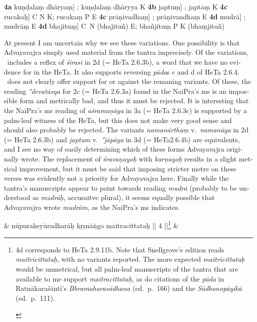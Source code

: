\documentclass[naipra.tex]{subfiles}
\begin{document}
\begin{sanskrit}
{\begin{english}
\begin{prosequote}
		\noindent \textbf{4a} kuṇḍalaṃ dhāryaṃ] ; kuṇḍalaṃ dhāryya K
		\textbf{4b} japtuṃ] ; japtaṃ K
		\textbf{4c} rucakaḥ] C N K; rucakaṃ P E
		\textbf{4c} prāṇivadhaṃ] ; prāṇivandhaṃ E
		\textbf{4d} mudrā] ; mudrāṃ E
		\textbf{4d} bhajituṃ] C\PCreading\ N (bhajituñ) E; bhañjituṃ P K (bhaṃjituñ)
	\end{prosequote}

	At present I am uncertain why we see these variations.
	One possibility is that Advayavajra simply used material from the tantra imprecisely.
	Of the variations, \TIB\ includes a reflex of \emph{śirasi} in 2d (= HeTa 2.6.3b), a word that we have no evidence for in the HeTa.
	It also supports reversing \emph{pāda}s c and d of HeTa 2.6.4.
	\TIB\ does not clearly offer support for or against the remaning variants. 
	Of these, the reading \emph{°devatāsya} for 2c (= HeTa 2.6.3a) found in the NaiPra's ms is an impossible form and metrically bad, and thus it must be rejected.
	It is interesting that the NaiPra's ms reading of \emph{aśramaṇāya} in 3a (= HeTa 2.6.3c) is supported by a palm-leaf witness of the HeTa, but this does not make very good sense and should also probably be rejected.
	The variants \emph{namanārthaṃ} v.\ \emph{namanāya} in 2d (= HeTa 2.6.3b) and \emph{japtum} v.\ \emph{°jāpāya} in 3d (= HeTa2.6.4b) are equivalents, and I see no way of easily determining which of these forms Advayavajra originally wrote.
	The replacement of \emph{śravaṇayoḥ} with \emph{karṇayoḥ} results in a slight metrical improvement, but it must be said that imposing stricter metre on these verses was evidently not a priority for Advayavajra here. 
	Finally while the tantra's manuscripts appear to point towards reading \emph{mudrā} (probably to be understood as \emph{mudrāḥ}, accusaitve plural), it seems equally possible that Advayavajra wrote \emph{mudrām}, as the NaiPra's ms indicates.
\end{english}} &
nūpurakeyūradharāḥ kṛṣnāṅgo maitracittataḥ || 4 ||\footnote{\begin{english}
	4d corresponds to HeTa 2.9.11b.
	Note that Snellgrove's edition reads \emph{maitricittataḥ}, with no variants reported.
	The more expected \emph{maitrīcittataḥ} would be unmetrical, but all palm-leaf manuscripts of the tantra that are available to me support \emph{maitracittataḥ}, as do citations of the \emph{pāda} in Ratnākaraśānti's \emph{Bhramaharasādhana} (ed.\ p.\ 166) and the \emph{Sādhanopāyikā} (ed.\ p.\ 111). 
\end{english}} \&


\end{sanskrit}
\end{document}
